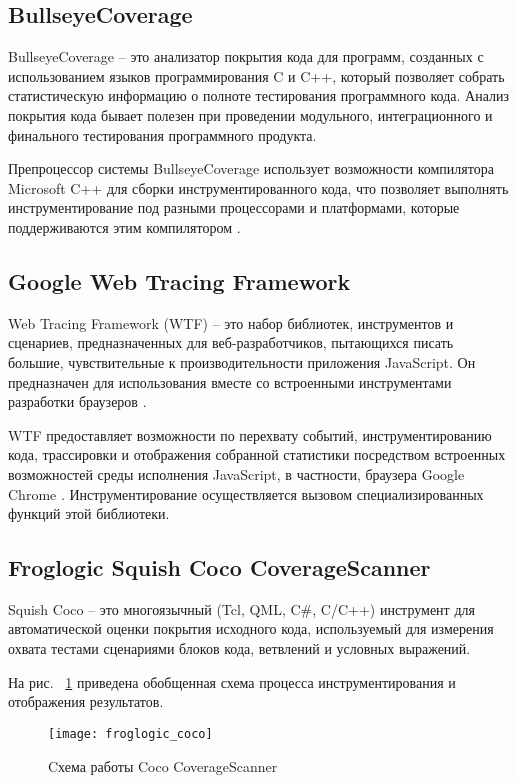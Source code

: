 \subsection{BullseyeCoverage}
BullseyeCoverage -- это анализатор покрытия кода для программ, созданных с использованием языков программирования C и C++, который позволяет собрать статистическую информацию о полноте тестирования программного кода. Анализ покрытия кода бывает полезен при проведении модульного, интеграционного и финального тестирования программного продукта.

Препроцессор системы BullseyeCoverage использует возможности компилятора Microsoft C++ для сборки инструментированного кода, что позволяет выполнять инструментирование под разными процессорами и платформами, которые поддерживаются этим компилятором \cite{reviewBullseyeCoverage}.

\subsection{Google Web Tracing Framework}
Web Tracing Framework (WTF) -- это набор библиотек, инструментов и сценариев, предназначенных для веб-разработчиков, пытающихся писать большие, чувствительные к производительности приложения JavaScript. Он предназначен для использования вместе со встроенными инструментами разработки браузеров \cite{reviewWTF}. 

WTF предоставляет возможности по перехвату событий, инструментированию кода, трассировки и отображения собранной статистики посредством встроенных возможностей среды исполнения JavaScript, в частности, браузера Google Chrome \cite{reviewWTF}. Инструментирование осуществляется вызовом специализированных функций этой библиотеки.

\subsection{Froglogic Squish Coco CoverageScanner}
Squish Coco -- это многоязычный (Tcl, QML, C\#, C/C++) инструмент для автоматической оценки покрытия исходного кода, используемый для измерения охвата тестами сценариями блоков кода, ветвлений и условных выражений.

На рис. ~\ref{fig:froglogic_coco} приведена обобщенная схема процесса инструментирования и отображения результатов.

\begin{figure}[!h]
	\centering
	\texttt{[image: froglogic\_coco]}
	\caption{Cхема работы Coco CoverageScanner}
	\label{fig:froglogic_coco}
\end{figure}


